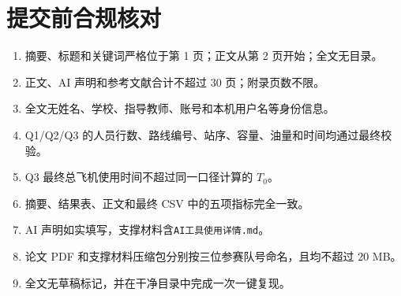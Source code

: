 \documentclass[UTF8,a4paper,zihao=5]{ctexart}
\begin{document}
\section{提交前合规核对}
\begin{enumerate}[label=$\square$]
  \item 摘要、标题和关键词严格位于第 1 页；正文从第 2 页开始；全文无目录。
  \item 正文、AI 声明和参考文献合计不超过 30 页；附录页数不限。
  \item 全文无姓名、学校、指导教师、账号和本机用户名等身份信息。
  \item Q1/Q2/Q3 的人员行数、路线编号、站序、容量、油量和时间均通过最终校验。
  \item Q3 最终总飞机使用时间不超过同一口径计算的 $T_0$。
  \item 摘要、结果表、正文和最终 CSV 中的五项指标完全一致。
  \item AI 声明如实填写，支撑材料含\texttt{AI工具使用详情.md}。
  \item 论文 PDF 和支撑材料压缩包分别按三位参赛队号命名，且均不超过 20 MB。
  \item 全文无草稿标记，并在干净目录中完成一次一键复现。
\end{enumerate}
\end{document}

